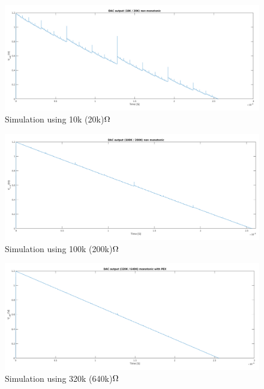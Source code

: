 \documentclass[english, 12pt, a4paper]{ifimaster}
\begin{document}
\begin{figure}[!ht]
 \centering
 \includegraphics[width=\textwidth]{img/non_monotonic/non_monotonic_10K}
 \caption{Simulation using 10k (20k)\(\ohm\)}
 \label{fig:sim:dac:10k}
\end{figure}
\begin{figure}[!ht]
 \centering
 \includegraphics[width=\textwidth]{img/non_monotonic/non_monotonic_100K}
 \caption{Simulation using 100k (200k)\(\ohm\)}
 \label{fig:sim:dac:100k}
\end{figure}
\begin{figure}[!ht]
 \centering
 \includegraphics[width=\textwidth]{img/non_monotonic/non_monotonic_320K}
 \caption{Simulation using 320k (640k)\(\ohm\)}
 \label{fig:sim:dac:320k}
\end{figure}
\end{document}
